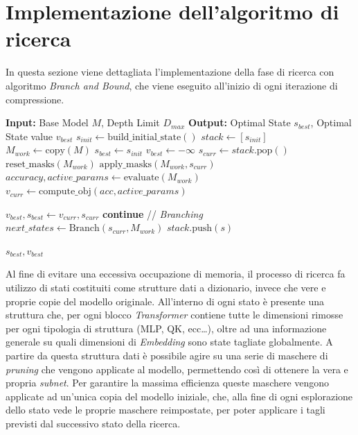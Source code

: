 \section{Implementazione dell'algoritmo di ricerca}
In questa sezione viene dettagliata l'implementazione della fase di ricerca con algoritmo \textit{Branch and Bound}, che viene eseguito all'inizio di ogni iterazione di compressione. \newline
\begin{algorithm}[H]
\caption{Ricerca NAS via Depth-First Branch and Bound a profondità limitata}
\label{alg:nas_search}
\begin{algorithmic}[1]
    \State \textbf{Input:} Base Model $M$, Depth Limit $D_{max}$
    \State \textbf{Output:} Optimal State $s_{best}$, Optimal State value $v_{best}$
    \State $s_{init} \gets \text{build\_initial\_state}()$
    \State $stack \gets [s_{init}]$ 
    \State $M_{work} \gets \text{copy}(M)$
    \State $s_{best} \gets s_{init}$
    \State $v_{best} \gets -\infty$
        \State $s_{curr} \gets stack.\text{pop}()$
        \State $\text{reset\_masks}(M_{work})$
        \State $\text{apply\_masks}(M_{work}, s_{curr})$
        \State $accuracy, active\_params \gets \text{evaluate}(M_{work})$ 
        \State $v_{curr} \gets \text{compute\_obj}(acc, active\_params)$

            \State $v_{best}, s_{best} \gets v_{curr}, s_{curr}$
        \EndIf
            \State \textbf{continue} 
        \EndIf
        \State // \textit{Branching}
        \State $next\_states \gets \text{Branch}(s_{curr}, M_{work})$
            \State $stack.\text{push}(s)$
        \EndFor
    \EndWhile
    
    \State \Return $s_{best}, v_{best}$
\end{algorithmic}
\end{algorithm}
Al fine di evitare una eccessiva occupazione di memoria, il processo di ricerca fa utilizzo di stati costituiti come strutture dati a dizionario, invece che vere e proprie copie del modello originale. All'interno di ogni stato è presente una struttura che, per ogni blocco \textit{Transformer} contiene tutte le dimensioni rimosse per ogni tipologia di struttura (MLP, QK, ecc\dots), oltre ad una informazione generale su quali dimensioni di \textit{Embedding} sono state tagliate globalmente. \newline
A partire da questa struttura dati è possibile agire su una serie di maschere di \textit{pruning} che vengono applicate al modello, permettendo così di ottenere la vera e propria \textit{subnet}. Per garantire la massima efficienza queste maschere vengono applicate ad un'unica copia del modello iniziale, che, alla fine di ogni esplorazione dello stato vede le proprie maschere reimpostate, per poter applicare i tagli previsti dal successivo stato della ricerca.



